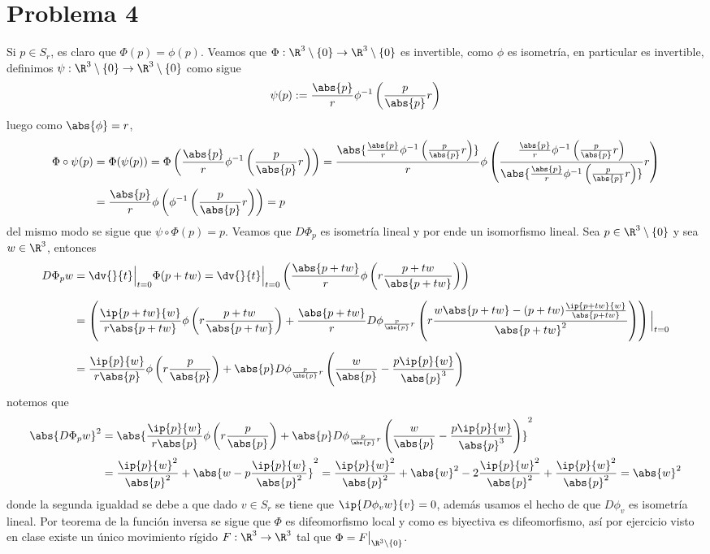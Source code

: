 \documentclass{article}
\begin{document}
\section*{Problema 4}
\noindent Si $p\in S_{r}$, es claro que $\Phi(p)=\phi(p)$. Veamos que $\Phi:\R^{3}\setminus\{0\}
\to\R^{3}\setminus\{0\}$ es invertible, como $\phi$ es isometría, en particular es invertible, 
definimos $\psi:\R^{3}\setminus\{0\}\to\R^{3}\setminus\{0\}$ como sigue
\begin{equation*}
    \psi(p):=\frac{\abs{p}}{r}\phi^{-1}\left(\frac{p}{\abs{p}}r\right)
\end{equation*}
luego como $\abs{\phi}=r$,
\begin{align*}
    \Phi\circ\psi(p) &= \Phi(\psi(p))=\Phi\left(\frac{\abs{p}}{r}\phi^{-1}
    \left(\frac{p}{\abs{p}}r\right)\right)=\frac{\abs{\frac{\abs{p}}{r}\phi^{-1}\left(\frac{p}
    {\abs{p}}r\right)}}{r}\phi\left(\frac{\frac{\abs{p}}{r}\phi^{-1}\left(\frac{p}
    {\abs{p}}r\right)}{\abs{\frac{\abs{p}}{r}\phi^{-1}\left(\frac{p}{\abs{p}}r\right)}}r\right) \\
    &= \frac{\abs{p}}{r}\phi\left(\phi^{-1}\left(\frac{p}{\abs{p}}r\right)\right)=p
\end{align*}
del mismo modo se sigue que $\psi\circ\Phi(p)=p$. Veamos que $D\Phi_{p}$ es isometría lineal y por 
ende un isomorfismo lineal. Sea $p\in\R^{3}\setminus\{0\}$ y sea $w\in\R^{3}$, entonces
\begin{align*}
    D\Phi_{p}w &= \dv{}{t}\Big|_{t=0}\Phi(p+tw)=\dv{}{t}\Big|_{t=0}\left(\frac{\abs{p+tw}}{r}\phi
    \left(r\frac{p+tw}{\abs{p+tw}}\right)\right) \\[2mm]
    &= \left(\frac{\ip{p+tw}{w}}{r\abs{p+tw}}\phi\left(r\frac{p+tw}{\abs{p+tw}}\right)
    +\frac{\abs{p+tw}}{r}D\phi_{\frac{p}{\abs{p}}r}\left(r\frac{w\abs{p+tw}-(p+tw)
    \frac{\ip{p+tw}{w}}{\abs{p+tw}}}{\abs{p+tw}^{2}}\right)\right)\Big|_{t=0} \\[2mm]
    &= \frac{\ip{p}{w}}{r\abs{p}}\phi\left(r\frac{p}{\abs{p}}\right)+\abs{p}
    D\phi_{\frac{p}{\abs{p}}r}\left(\frac{w}{\abs{p}}-\frac{p\ip{p}{w}}{\abs{p}^{3}}\right)
\end{align*}
notemos que
\begin{align*}
    \abs{D\Phi_{p}w}^{2} &= \abs{\frac{\ip{p}{w}}{r\abs{p}}\phi\left(r\frac{p}{\abs{p}}\right)+
    \abs{p}D\phi_{\frac{p}{\abs{p}}r}\left(\frac{w}{\abs{p}}-\frac{p\ip{p}{w}}{\abs{p}^{3}}
    \right)}^{2} \\
    &= \frac{\ip{p}{w}^{2}}{\abs{p}^{2}}+\abs{w-p\frac{\ip{p}{w}}{\abs{p}^{2}}}^{2}
    =\frac{\ip{p}{w}^{2}}{\abs{p}^{2}}+\abs{w}^{2}-2\frac{\ip{p}{w}^{2}}{\abs{p}^{2}}
    +\frac{\ip{p}{w}^{2}}{\abs{p}^{2}}=\abs{w}^{2}
\end{align*}
donde la segunda igualdad se debe a que dado $v\in S_{r}$ se tiene que $\ip{D\phi_{v}w}{v}=0$, 
además usamos el hecho de que $D\phi_{v}$ es isometría lineal. Por teorema de la función inversa
se sigue que $\Phi$ es difeomorfismo local y como es biyectiva es difeomorfismo, así por ejercicio
visto en clase existe un único movimiento rígido $F:\R^{3}\to\R^{3}$ 
tal que $\Phi=F\big|_{\R^{3}\setminus\{0\}}$.
\end{document}
